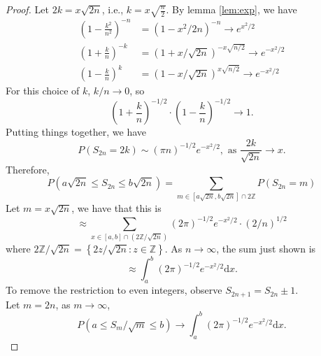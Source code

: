 \begin{proof}
	Let $2k=x\sqrt{2n}$, i.e., $k=x\sqrt{\frac{n}{2}}$. By lemma \ref{lem:exp}, we have
	\begin{equation*}
		\begin{aligned}
			\left(1-\frac{k^{2}}{n^{2}}\right)^{-n} & =\left(1-x^{2} / 2 n\right)^{-n} \rightarrow e^{x^{2} / 2}       \\
			\left(1+\frac{k}{n}\right)^{-k}         & =(1+x / \sqrt{2 n})^{-x \sqrt{n / 2}} \rightarrow e^{-x^{2} / 2} \\
			\left(1-\frac{k}{n}\right)^{k}          & =(1-x / \sqrt{2 n})^{x \sqrt{n / 2}} \rightarrow e^{-x^{2} / 2}
		\end{aligned}
	\end{equation*}
	For this choice of $k$, $k/n \rightarrow 0$, so
	\begin{equation*}
		\left(1+\frac{k}{n}\right)^{-1 / 2} \cdot\left(1-\frac{k}{n}\right)^{-1 / 2} \rightarrow 1.
	\end{equation*}
	Putting things together, we have
	\begin{equation*}
		P\left(S_{2 n}=2 k\right) \sim (\pi n)^{-1 / 2} e^{-x^{2} / 2}, \text{ as } \frac{2k}{\sqrt{2n}} \rightarrow x.
	\end{equation*}
	Therefore,
	\begin{equation*}
		P\left( a\sqrt{2n} \leq S_{2 n} \leq b\sqrt{2 n} \right) = \sum_{m \in \left[a\sqrt{2 n},b\sqrt{2 n}\right] \cap 2\mathbb{Z}} P\left(S_{2 n}=m\right)
	\end{equation*}
	Let $m=x\sqrt{2 n}$, we have that this is
	\begin{equation*}
		\approx \sum_{x \in \left[a,b\right] \cap \left(2\mathbb{Z} / \sqrt{2 n}\right)}(2 \pi)^{-1 / 2} e^{-x^{2} / 2}\cdot(2/n)^{1/2}
	\end{equation*}
	where $2\mathbb{Z} / \sqrt{2 n} = \left\{2z/\sqrt{2n} : z\in\mathbb{Z}\right\}$. As $n\rightarrow\infty$, the sum just shown is
	\begin{equation*}
		\approx \int_{a}^{b}(2 \pi)^{-1 / 2} e^{-x^{2} / 2} \mathrm{d} x.
	\end{equation*}
	To remove the restriction to even integers, observe $S_{2 n +1}=S_{2 n} \pm 1$.\\
	Let $m=2n$, as $m\rightarrow\infty$,
	\begin{equation*}
		P\left(a \leq S_{m} / \sqrt{m} \leq b\right) \rightarrow \int_{a}^{b}(2 \pi)^{-1 / 2} e^{-x^{2} / 2} \mathrm{d} x.
	\end{equation*}
\end{proof}


